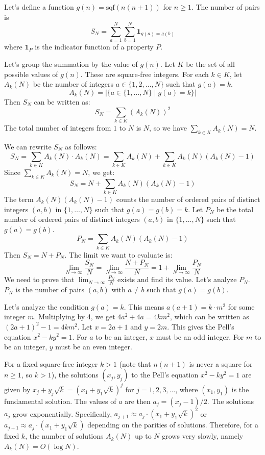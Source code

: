 \documentclass[12pt,a4paper]{article}
\theoremstyle{definition}
\begin{document}
    Let's define a function $g(n) = \text{sqf}(n(n+1))$ for $n \geq 1$. The number of pairs is
    \[ S_N = \sum_{a=1}^N \sum_{b=1}^N \mathbf{1}_{g(a)=g(b)} \]
    where $\mathbf{1}_{P}$ is the indicator function of a property $P$.

    Let's group the summation by the value of $g(n)$. Let $K$ be the set of all possible values of $g(n)$. These are square-free integers. For each $k \in K$, let $A_k(N)$ be the number of integers $a \in \{1, 2, \ldots, N\}$ such that $g(a)=k$.
    \[ A_k(N) = |\{a \in \{1, \ldots, N\} \mid g(a)=k\}| \]
    Then $S_N$ can be written as:
    \[ S_N = \sum_{k \in K} (A_k(N))^2 \]
    The total number of integers from $1$ to $N$ is $N$, so we have $\sum_{k \in K} A_k(N) = N$.

    We can rewrite $S_N$ as follows:
    \[ S_N = \sum_{k \in K} A_k(N) \cdot A_k(N) = \sum_{k \in K} A_k(N) + \sum_{k \in K} A_k(N)(A_k(N)-1) \]
    Since $\sum_{k \in K} A_k(N) = N$, we get:
    \[ S_N = N + \sum_{k \in K} A_k(N)(A_k(N)-1) \]
    The term $A_k(N)(A_k(N)-1)$ counts the number of ordered pairs of distinct integers $(a,b)$ in $\{1, \ldots, N\}$ such that $g(a)=g(b)=k$.
    Let $P_N$ be the total number of ordered pairs of distinct integers $(a,b)$ in $\{1, \ldots, N\}$ such that $g(a)=g(b)$.
    \[ P_N = \sum_{k \in K} A_k(N)(A_k(N)-1) \]
    Then $S_N = N + P_N$. The limit we want to evaluate is:
    \[ \lim_{N\to\infty}\frac{S_N}{N} = \lim_{N\to\infty}\frac{N+P_N}{N} = 1 + \lim_{N\to\infty}\frac{P_N}{N} \]
    We need to prove that $\lim_{N\to\infty} \frac{P_N}{N}$ exists and find its value. Let's analyze $P_N$. $P_N$ is the number of pairs $(a,b)$ with $a \neq b$ such that $g(a)=g(b)$.

    Let's analyze the condition $g(a)=k$. This means $a(a+1) = k \cdot m^2$ for some integer $m$.
    Multiplying by 4, we get $4a^2+4a = 4km^2$, which can be written as $(2a+1)^2 - 1 = 4km^2$.
    Let $x = 2a+1$ and $y=2m$. This gives the Pell's equation $x^2 - k y^2 = 1$.
    For $a$ to be an integer, $x$ must be an odd integer. For $m$ to be an integer, $y$ must be an even integer.

    For a fixed square-free integer $k>1$ (note that $n(n+1)$ is never a square for $n \geq 1$, so $k>1$), the solutions $(x_j, y_j)$ to the Pell's equation $x^2-ky^2=1$ are given by $x_j + y_j\sqrt{k} = (x_1+y_1\sqrt{k})^j$ for $j=1,2,3,\ldots$, where $(x_1, y_1)$ is the fundamental solution.
    The values of $a$ are then $a_j = (x_j-1)/2$. The solutions $a_j$ grow exponentially. Specifically, $a_{j+1} \approx a_j \cdot (x_1+y_1\sqrt{k})^2$ or $a_{j+1} \approx a_j \cdot (x_1+y_1\sqrt{k})$ depending on the parities of solutions.
    Therefore, for a fixed $k$, the number of solutions $A_k(N)$ up to $N$ grows very slowly, namely $A_k(N) = O(\log N)$.
\end{document}
